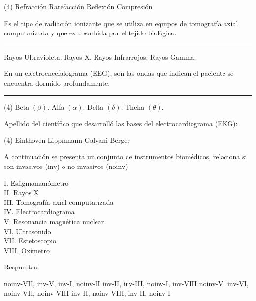 \documentclass[12pt, letter]{exam}
\begin{document}
\begin{questions}
    \begin{tasks}(4)
        \task Refracción
        \task Rarefacción
        \task Reflexión
        \task Compresión
    \end{tasks}
    \question Es el tipo de radiación ionizante que se utiliza en equipos de tomografía axial computarizada y que es absorbida por el tejido biológico: \rule{2cm}{0.1mm}
    \begin{multicols}{2}
    \begin{tasks}
        \task Rayos Ultravioleta.
        \task Rayos X.
        \task Rayos Infrarrojos.
        \task Rayos Gamma.
    \end{tasks}
    \end{multicols}
    \question En un electroencefalograma (EEG), son las ondas que indican el paciente se encuentra dormido profundamente: \rule{2cm}{0.1mm}
    \begin{tasks}(4)
        \task Beta $(\beta)$.
        \task Alfa $(\alpha)$.
        \task Delta $(\delta)$.
        \task Theha $(\theta)$.
    \end{tasks}
    \question Apellido del científico que desarrolló las bases del electrocardiograma (EKG):
    \begin{tasks}(4)
        \task Einthoven
        \task Lippmnann
        \task Galvani
        \task Berger
    \end{tasks}

    \newpage

    \question A continuación se presenta un conjunto de instrumentos biomédicos, relaciona si son invasivos (inv) o no invasivos (noinv)
    \begin{multicols}{2}
        I. Esfigmomanómetro \\
        II. Rayos X  \\
        III. Tomografía axial computarizada \\
        IV. Electrocardiograma \\
        V. Resonancia magnética nuclear \\
        VI. Ultrasonido \\
        VII. Estetoscopio \\
        VIII. Oxímetro
    \end{multicols}

    \vspace{0.3cm}
    Respuestas:
    \begin{tasks}
        \task noinv-VII, inv-V, inv-I, noinv-II
        \task inv-II, inv-III, noinv-I, inv-VIII
        \task noinv-V, inv-VI, noinv-VII, noinv-VIII
        \task inv-II, noinv-VIII, inv-II, noinv-I
    \end{tasks}
    

\end{questions}
\end{document}
